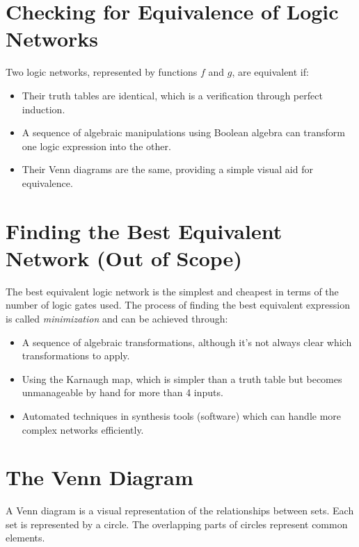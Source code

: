 \documentclass[12pt,openany, tikz,border=10pt]{book}
\begin{document}
			      	\newpage
			      	\section*{Checking for Equivalence of Logic Networks}
			      	
			      	Two logic networks, represented by functions \( f \) and \( g \), are equivalent if:
			      	\begin{itemize}
			      		\item[] Their truth tables are identical, which is a verification through perfect induction.
			      		\item[] A sequence of algebraic manipulations using Boolean algebra can transform one logic expression into the other.
			      		\item[] Their Venn diagrams are the same, providing a simple visual aid for equivalence.
			      	\end{itemize}
			      	  
			      	\section*{Finding the Best Equivalent Network (Out of Scope)}
			      	  
			      	The best equivalent logic network is the simplest and cheapest in terms of the number of logic gates used. The process of finding the best equivalent expression is called \emph{minimization} and can be achieved through:
			      	\begin{itemize}
			      		\item[] A sequence of algebraic transformations, although it's not always clear which transformations to apply.
			      		\item[] Using the Karnaugh map, which is simpler than a truth table but becomes unmanageable by hand for more than 4 inputs.
			      		\item[] Automated techniques in synthesis tools (software) which can handle more complex networks efficiently.
			      	\end{itemize}
			      	  
			      	\section{The Venn Diagram}
			      	A Venn diagram is a visual representation of the relationships between sets. Each set is represented by a circle. The overlapping parts of circles represent common elements.
			      	
\end{document}
